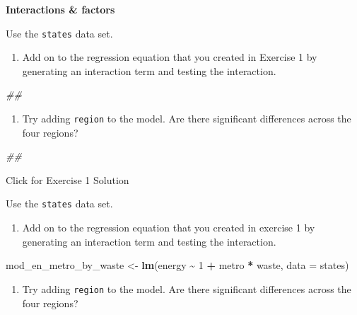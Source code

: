 \documentclass[
]{book}
\newenvironment{Shaded}{\begin{snugshade}}{\end{snugshade}}
\newcommand{\CommentTok}[1]{\textcolor[rgb]{0.56,0.35,0.01}{\textit{#1}}}
\newcommand{\DataTypeTok}[1]{\textcolor[rgb]{0.13,0.29,0.53}{#1}}
\newcommand{\DecValTok}[1]{\textcolor[rgb]{0.00,0.00,0.81}{#1}}
\newcommand{\KeywordTok}[1]{\textcolor[rgb]{0.13,0.29,0.53}{\textbf{#1}}}
\newcommand{\NormalTok}[1]{#1}
\newcommand{\OperatorTok}[1]{\textcolor[rgb]{0.81,0.36,0.00}{\textbf{#1}}}
\newcommand{\StringTok}[1]{\textcolor[rgb]{0.31,0.60,0.02}{#1}}
\providecommand{\tightlist}{%
  \setlength{\itemsep}{0pt}\setlength{\parskip}{0pt}}
\begin{document}
\textbf{Interactions \& factors}

Use the \texttt{states} data set.

\begin{enumerate}
\def\labelenumi{\arabic{enumi}.}
\tightlist
\item
  Add on to the regression equation that you created in Exercise 1 by generating an interaction term and testing the interaction.
\end{enumerate}

\begin{Shaded}
\begin{Highlighting}[]
\CommentTok{\#\# }
\end{Highlighting}
\end{Shaded}

\begin{enumerate}
\def\labelenumi{\arabic{enumi}.}
\setcounter{enumi}{1}
\tightlist
\item
  Try adding \texttt{region} to the model. Are there significant differences across the four regions?
\end{enumerate}

\begin{Shaded}
\begin{Highlighting}[]
\CommentTok{\#\# }
\end{Highlighting}
\end{Shaded}

{Click for Exercise 1 Solution}

Use the \texttt{states} data set.

\begin{enumerate}
\def\labelenumi{\arabic{enumi}.}
\tightlist
\item
  Add on to the regression equation that you created in exercise 1 by generating an interaction term and testing the interaction.
\end{enumerate}

\begin{Shaded}
\begin{Highlighting}[]
\NormalTok{  mod\_en\_metro\_by\_waste \textless{}{-}}\StringTok{ }\KeywordTok{lm}\NormalTok{(energy }\OperatorTok{\textasciitilde{}}\StringTok{ }\DecValTok{1} \OperatorTok{+}\StringTok{ }\NormalTok{metro }\OperatorTok{*}\StringTok{ }\NormalTok{waste, }\DataTypeTok{data =}\NormalTok{ states)}
\end{Highlighting}
\end{Shaded}

\begin{enumerate}
\def\labelenumi{\arabic{enumi}.}
\setcounter{enumi}{1}
\tightlist
\item
  Try adding \texttt{region} to the model. Are there significant differences across the four regions?
\end{enumerate}
\end{document}
